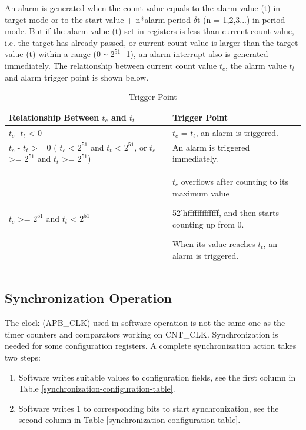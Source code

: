 \documentclass[main\_\_EN.tex]{subfiles}
\begin{document}
An alarm is generated when the count value equals to the alarm value (t) in target mode or to the start value + n*alarm period $\delta$t (n = 1,2,3...) in period mode. But if the alarm value (t) set in registers is less than current count value, i.e. the target has already passed, or current count value is larger than the target value (t) within a range (0 \verb+~+ $2^{51}$ -1), an alarm interrupt also is generated immediately. The relationship between current count value $t_{c}$, the alarm value $t_{t}$ and alarm trigger point is shown below.

\begin{longtable}[c]{ | p{5cm} | p{7.5cm} |}
\caption{Trigger Point}\\\hline
\rowcolor{lightgray}
\textbf{Relationship Between $t_{c}$ and $t_{t}$} & \textbf{Trigger Point}\\ \hline
\endhead
$t_{c}$- $t_{t}$ < 0 & $t_{c}$ = $t_{t}$, an alarm is triggered.\\ \hline
$t_{c}$ - $t_{t}$ >= 0 \newline ( $t_{c}$ < $2^{51}$ and $t_{t}$ < $2^{51}$, \newline or $t_{c}$ >= $2^{51}$ and $t_{t}$ >= $2^{51}$) & An alarm is triggered immediately. \\ \hline
\multirow{3}{*}{
$t_{c}$ >= $2^{51}$ and $t_{t}$ < $2^{51}$} &

$t_{c}$ overflows after counting to its maximum value

52'hfffffffffffff, and then starts counting up from 0.

When its value reaches $t_{t}$, an alarm is triggered. \\ \hline
\end{longtable}

\subsection{Synchronization Operation}
The clock (APB\_CLK) used in software operation is not the same one as the timer counters and comparators working on CNT\_CLK. Synchronization is needed for some configuration registers. A complete synchronization action takes two steps:

\begin{enumerate}
    \item Software writes suitable values to configuration fields, see the first column in Table \ref{synchronization-configuration-table}.
    \item Software writes 1 to corresponding bits to start synchronization, see the second column in Table \ref{synchronization-configuration-table}.
\end{enumerate}
\end{document}
